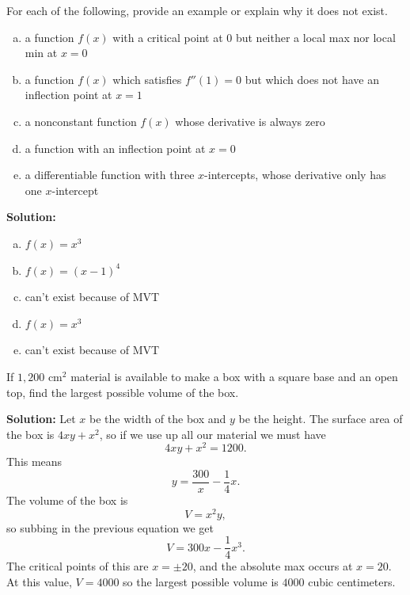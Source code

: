 \documentclass[11pt]{exam}
\theoremstyle{definition}
\begin{document}
\begin{questions}
\newpage
\question[10]\mbox{}
For each of the following, provide an example or explain why it does not exist.
\begin{enumerate}[(a)]
\item  a function $f(x)$ with a critical point at $0$ but neither a local max nor local min at $x=0$
\vspace{1.2in}
\item  a function $f(x)$ which satisfies $f''(1) = 0$ but which does not have an inflection point at $x=1$
\vspace{1.2in}
\item  a nonconstant function $f(x)$ whose derivative is always zero
\vspace{1.2in}
\item  a function with an inflection point at $x=0$
\vspace{1.2in}
\item  a differentiable function with three $x$-intercepts, whose derivative only has one $x$-intercept
\vspace{1.2in}
\end{enumerate}
\textbf{Solution:}
\begin{enumerate}[(a)]
\item  $f(x) = x^3$
\item  $f(x) = (x-1)^4$
\item  can't exist because of MVT
\item  $f(x) = x^3$
\item  can't exist because of MVT
\end{enumerate}

\newpage
\question[10]
If $1,200$ cm$^2$ material is available to make a box with a square base and an open top, find the largest possible volume of the box.

\textbf{Solution:}
Let $x$ be the width of the box and $y$ be the height.
The surface area of the box is $4xy+x^2$, so if we use up all our material we must have
$$4xy+x^2=1200.$$
This means
$$y = \frac{300}{x} - \frac{1}{4}x.$$
The volume of the box is
$$V = x^2y,$$
so subbing in the previous equation we get
$$V = 300x - \frac{1}{4}x^3.$$
The critical points of this are $x=\pm 20$, and the absolute max occurs at $x=20$.
At this value, $V = 4000$ so the largest possible volume is $4000$ cubic centimeters.


\end{questions}
\end{document}
